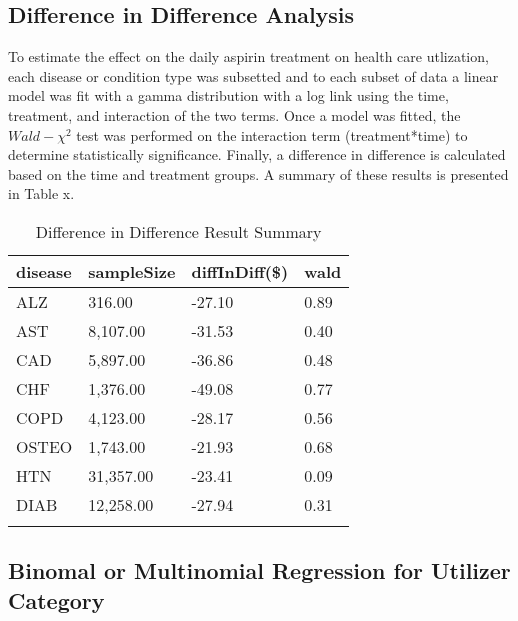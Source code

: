 \documentclass[
  english,
  man]{apa6}
\begin{document}
\hypertarget{difference-in-difference-analysis}{%
\subsection{Difference in Difference Analysis}\label{difference-in-difference-analysis}}

To estimate the effect on the daily aspirin treatment on health care utlization, each disease or condition type was subsetted and to each subset of data a linear model was fit with a gamma distribution with a log link using the time, treatment, and interaction of the two terms. Once a model was fitted, the \(Wald-\chi^2\) test was performed on the interaction term (treatment*time) to determine statistically significance. Finally, a difference in difference is calculated based on the time and treatment groups. A summary of these results is presented in Table x.

\begin{table}[tbp]

\begin{center}
\begin{threeparttable}

\caption{\label{tab:diffTable}Difference in Difference Result Summary}

\begin{tabular}{llll}
\toprule{}
disease & \multicolumn{1}{c}{sampleSize} & \multicolumn{1}{c}{diffInDiff(\$)} & \multicolumn{1}{c}{wald}\\
\midrule{}
ALZ & 316.00 & -27.10 & 0.89\\
AST & 8,107.00 & -31.53 & 0.40\\
CAD & 5,897.00 & -36.86 & 0.48\\
CHF & 1,376.00 & -49.08 & 0.77\\
COPD & 4,123.00 & -28.17 & 0.56\\
OSTEO & 1,743.00 & -21.93 & 0.68\\
HTN & 31,357.00 & -23.41 & 0.09\\
DIAB & 12,258.00 & -27.94 & 0.31\\
\bottomrule{}
\end{tabular}

\end{threeparttable}
\end{center}

\end{table}

\hypertarget{binomal-or-multinomial-regression-for-utilizer-category}{%
\subsection{Binomal or Multinomial Regression for Utilizer Category}\label{binomal-or-multinomial-regression-for-utilizer-category}}
\end{document}
